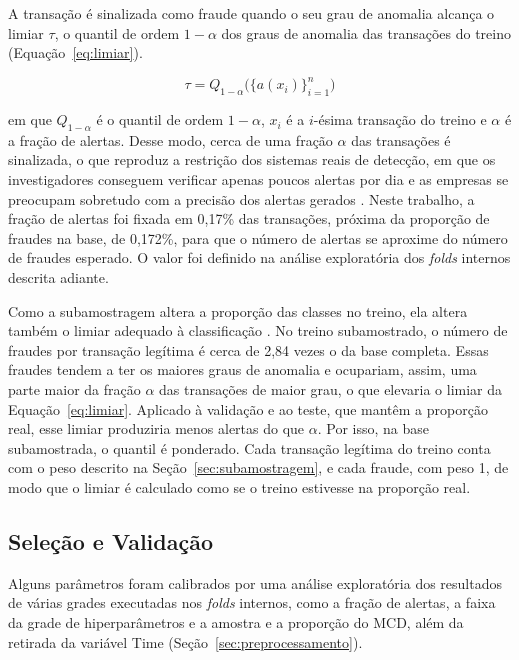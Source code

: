 \documentclass{uflamon}          %
\begin{document}
A transação é sinalizada como fraude quando o seu grau de anomalia alcança o limiar $\tau$, o quantil de ordem $1 - \alpha$ dos graus de anomalia das transações do treino (Equação~\ref{eq:limiar}).

\begin{equation}
    \tau = Q_{1-\alpha}\big(\{a(x_i)\}_{i=1}^{n}\big)
    \label{eq:limiar}
\end{equation}

em que $Q_{1-\alpha}$ é o quantil de ordem $1 - \alpha$, $x_i$ é a $i$-ésima transação do treino e $\alpha$ é a fração de alertas. Desse modo, cerca de uma fração $\alpha$ das transações é sinalizada, o que reproduz a restrição dos sistemas reais de detecção, em que os investigadores conseguem verificar apenas poucos alertas por dia e as empresas se preocupam sobretudo com a precisão dos alertas gerados \cite{dalpozzolo2018}. Neste trabalho, a fração de alertas foi fixada em 0,17\% das transações, próxima da proporção de fraudes na base, de 0,172\%, para que o número de alertas se aproxime do número de fraudes esperado. O valor foi definido na análise exploratória dos \textit{folds} internos descrita adiante.

Como a subamostragem altera a proporção das classes no treino, ela altera também o limiar adequado à classificação \cite{dalpozzolo2015}. No treino subamostrado, o número de fraudes por transação legítima é cerca de 2,84 vezes o da base completa. Essas fraudes tendem a ter os maiores graus de anomalia e ocupariam, assim, uma parte maior da fração $\alpha$ das transações de maior grau, o que elevaria o limiar da Equação~\ref{eq:limiar}. Aplicado à validação e ao teste, que mantêm a proporção real, esse limiar produziria menos alertas do que $\alpha$. Por isso, na base subamostrada, o quantil é ponderado. Cada transação legítima do treino conta com o peso descrito na Seção~\ref{sec:subamostragem}, e cada fraude, com peso 1, de modo que o limiar é calculado como se o treino estivesse na proporção real.

\subsection{Seleção e Validação}

Alguns parâmetros foram calibrados por uma análise exploratória dos resultados de várias grades executadas nos \textit{folds} internos, como a fração de alertas, a faixa da grade de hiperparâmetros e a amostra e a proporção do MCD, além da retirada da variável Time (Seção~\ref{sec:preprocessamento}).
\end{document}
